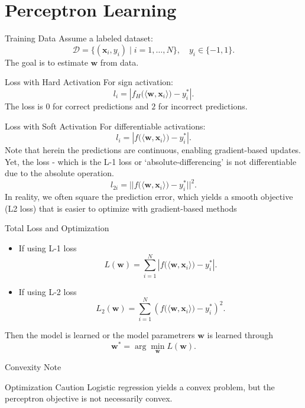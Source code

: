 \documentclass[10pt]{beamer}
\begin{document}
\section{Perceptron Learning}

\begin{frame}{Training Data}
  \justifying
  Assume a labeled dataset:
  \[
    \mathcal{D} = \{(\bm{x}_i, y_i) \mid i=1,\ldots,N\}, \quad y_i \in \{-1,1\}.
  \]
  The goal is to estimate $\bm{w}$ from data.
\end{frame}

\begin{frame}{Loss with Hard Activation}
  \justifying
  For sign activation:
  \[
    l_i = \left| f_H\bigl(\langle \bm{w}, \bm{x}_i \rangle\bigr) - y_i^* \right|.
  \]
  The loss is $0$ for correct predictions and $2$ for incorrect predictions.
\end{frame}

\begin{frame}{Loss with Soft Activation}
  \justifying
  For differentiable activations:
  \[
    l_i = \left| f\bigl(\langle \bm{w}, \bm{x}_i \rangle\bigr) - y_i^* \right|.
  \]
  Note that herein the predictions are continuous, enabling gradient-based updates. Yet, the loss - which is the L-1 loss or `absolute-differencing' is not differentiable due to the absolute operation. 
  \[
    l_{2i}= || f\bigl(\langle \bm{w}, \bm{x}_i \rangle\bigr) - y_i^* ||^2.
  \]
  In reality, we often square the prediction error, which yields a smooth objective (L2 loss) that is easier to optimize with gradient-based methods
\end{frame}

\begin{frame}{Total Loss and Optimization}
  \justifying
  \begin{itemize}
\item If using L-1 loss
  \[
    L(\bm{w}) = \sum_{i=1}^{N} \left| f\bigl(\langle \bm{w}, \bm{x}_i \rangle\bigr) - y_i^* \right|.
  \]
\item If using L-2 loss
  \[
    L_2(\bm{w}) = \sum_{i=1}^{N} \left( f\bigl(\langle \bm{w}, \bm{x}_i \rangle\bigr) - y_i^* \right)^2.
  \]
\end{itemize}
Then the model is learned or the model parametrers $\bm{w}$ is learned through
  \[
    \bm{w}^* = \arg\min_{\bm{w}} L(\bm{w}).
  \]
\end{frame}

\begin{frame}{Convexity Note}
  \justifying
  \begin{warningbox}{Optimization Caution}
    Logistic regression yields a convex problem, but the perceptron objective is not necessarily convex.
  \end{warningbox}
\end{frame}
\end{document}
